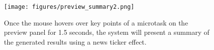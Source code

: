 \begin{figure}[ht]
\centering
\texttt{[image: figures/preview\_summary2.png]}
\caption{Once the mouse hovers over key points of a microtask on the preview panel for 1.5 seconds, the system will present a summary of the generated results using a news ticker effect.}
\label{fig:preview_summary}
\end{figure}